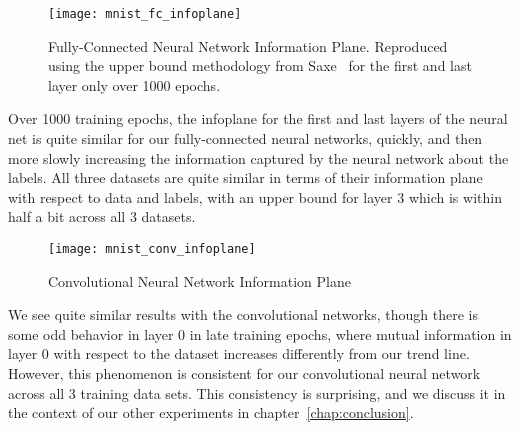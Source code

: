 \begin{figure}[h!]
\texttt{[image: mnist\_fc\_infoplane]}
\caption{Fully-Connected Neural Network Information Plane. Reproduced using the upper bound methodology from Saxe~\cite{saxe2019information} for the first and last layer only over 1000 epochs.}
\label{fig:mnist fc infoplane}
\centering
\end{figure}
Over 1000 training epochs, the infoplane for the first and last layers of the neural net is quite similar for our fully-connected neural networks, quickly, and then more slowly increasing the information captured by the neural network about the labels. 
All three datasets are quite similar in terms of their information plane with respect to data and labels, with an upper bound for layer 3 which is within half a bit across all 3 datasets.

\begin{figure}[h!]
\texttt{[image: mnist\_conv\_infoplane]}
\caption{Convolutional Neural Network Information Plane}
\label{fig:mnist conv infoplane}
\centering
\end{figure}
We see quite similar results with the convolutional networks, though there is some odd behavior in layer 0 in late training epochs, where mutual information in layer 0 with respect to the dataset increases differently from our trend line. 
However, this phenomenon is consistent for our convolutional neural network across all 3 training data sets.
This consistency is surprising, and we discuss it in the context of our other experiments in chapter~\ref{chap:conclusion}.